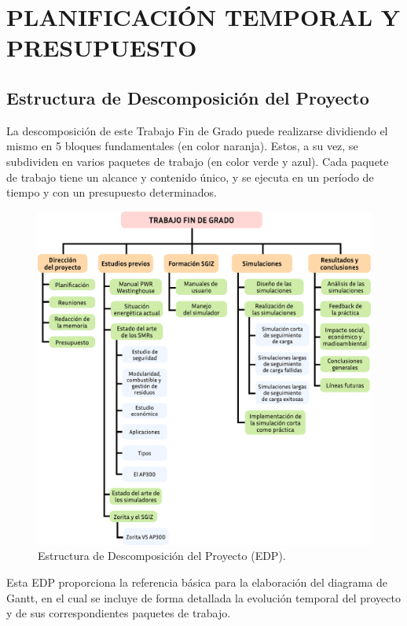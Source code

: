 \newpage
\section{PLANIFICACIÓN TEMPORAL Y PRESUPUESTO} \label{planificacion_presupuesto}

\subsection{Estructura de Descomposición del Proyecto}

La descomposición de este Trabajo Fin de Grado puede realizarse dividiendo el mismo en 5 bloques fundamentales (en color naranja). Estos, a su vez, se subdividen en varios paquetes de trabajo (en color verde y azul). Cada paquete de trabajo tiene un alcance y contenido único, y se ejecuta en un período de tiempo y con un presupuesto determinados.

\begin{figure}[h]
    \centering
    \includegraphics[width=\textwidth]{content/figures/edp_tfg.pdf}
    \caption{Estructura de Descomposición del Proyecto (EDP).}
    \label{fig:edp_tfg}
  \end{figure}

  Esta EDP proporciona la referencia básica para la elaboración del diagrama de Gantt, en el cual se incluye de forma detallada la evolución temporal del proyecto y de sus correspondientes paquetes de trabajo.

